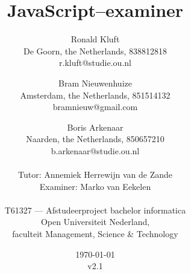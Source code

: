 
\title{JavaScript--examiner}
\author{
  Ronald Kluft\\
  De Goorn, the Netherlands, 838812818\\
  r.kluft@studie.ou.nl
  \and
  Bram Nieuwenhuize\\
  Amsterdam, the Netherlands, 851514132\\
  bramnieuw@gmail.com
  \and
  Boris Arkenaar\\
  Naarden, the Netherlands, 850657210\\
  b.arkenaar@studie.ou.nl\\
  \\
  Tutor: Annemiek Herrewijn van de Zande\\
  Examiner: Marko van Eekelen\\
  \\
  T61327 --- Afstudeerproject bachelor informatica\\
  Open Universiteit Nederland,\\
  faculteit Management, Science \& Technology}
\date{\today\\v2.1}
\maketitle


